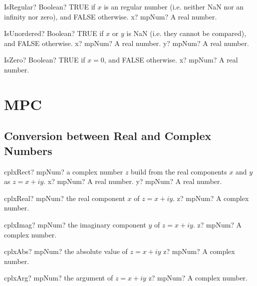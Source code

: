 \documentclass[12pt,a4paper,openany]{book}
\begin{document}
\begin{mpFunctionsExtract}
\mpFunctionOne
{IsRegular? Boolean? TRUE if $x$ is an regular number (i.e. neither NaN nor an infinity nor zero), and FALSE otherwise.}
{x? mpNum? A real number.}
\end{mpFunctionsExtract}

\begin{mpFunctionsExtract}
\mpFunctionTwo
{IsUnordered? Boolean? TRUE if $x$ or $y$ is NaN (i.e. they cannot be compared), and FALSE otherwise.}
{x? mpNum? A real number.}
{y? mpNum? A real number.}
\end{mpFunctionsExtract}

\begin{mpFunctionsExtract}
\mpFunctionOne
{IsZero? Boolean? TRUE if $x = 0$, and FALSE otherwise.}
{x? mpNum? A real number.}
\end{mpFunctionsExtract}

\chapter{MPC}

\section{Conversion between Real and Complex Numbers}

\begin{mpFunctionsExtract}
\mpFunctionTwo
{cplxRect? mpNum? a complex number $z$ build from the real components $x$ and $y$ as $z=x+iy$.}
{x? mpNum? A real number.}
{y? mpNum? A real number.}
\end{mpFunctionsExtract}

\begin{mpFunctionsExtract}
\mpFunctionOne
{cplxReal? mpNum? the real component $x$ of $z=x+iy$.}
{z? mpNum? A complex number.}
\end{mpFunctionsExtract}

\begin{mpFunctionsExtract}
\mpFunctionOne
{cplxImag? mpNum? the imaginary component $y$ of $z=x+iy$.}
{z? mpNum? A complex number.}
\end{mpFunctionsExtract}

\begin{mpFunctionsExtract}
\mpFunctionOne
{cplxAbs? mpNum? the absolute value of $z=x+iy$}
{z? mpNum? A complex number.}
\end{mpFunctionsExtract}

\begin{mpFunctionsExtract}
\mpFunctionOne
{cplxArg? mpNum? the argument of $z=x+iy$}
{z? mpNum? A complex number.}
\end{mpFunctionsExtract}
\end{document}
